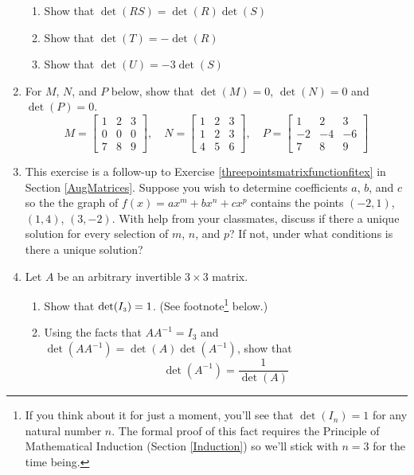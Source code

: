 \documentclass{ximera}
\begin{document}
\begin{enumerate}
\begin{enumerate}

\item Show that $\det(RS) = \det(R)\det(S)$
\item Show that $\det(T) = -\det(R)$
\item Show that $\det(U) = -3\det(S)$

\end{enumerate}

\item For $M$,  $N$, and $P$ below, show that $\det(M) = 0$, $\det(N) = 0$ and $\det(P) = 0$. \[M = \left[ \begin{array}{rrr} 1 & 2 & 3 \\ 0 & 0 & 0 \\ 7 & 8 & 9 \end{array} \right], \quad N = \left[ \begin{array}{rrr} 1 & 2 & 3 \\ 1 & 2 & 3 \\ 4 & 5 & 6 \end{array} \right] , \quad  P =  \left[ \begin{array}{rrr} 1 & 2 & 3 \\ -2 & -4 & -6 \\ 7 & 8 & 9 \end{array} \right]  \]

\item  This exercise is a follow-up to Exercise \ref{threepointsmatrixfunctionfitex} in Section \ref{AugMatrices}.   Suppose you wish to determine coefficients $a$, $b$, and $c$ so the the graph of $f(x) = ax^{m} + bx^{n} + cx^{p}$ contains the points  $(-2,1)$, $(1,4)$, $(3,-2)$.  With help from your classmates, discuss if there a unique solution for every selection of $m$, $n$, and $p$?  If not, under what conditions is there a unique solution?

\item Let $A$ be an arbitrary invertible $3 \times 3$ matrix.  

\begin{enumerate}

\item Show that $\det(I_{\mbox{\tiny$3$}}) = 1$. (See footnote\footnote{If you think about it for just a moment, you'll see that $\det(I_{n}) = 1$ for any natural number $n$.  The formal proof of this fact requires the Principle of Mathematical Induction (Section \ref{Induction}) so we'll stick with $n = 3$ for the time being.} below.)

\item Using the facts that $AA^{-1} = I_{3}$ and $\det(AA^{-1}) = \det(A)\det(A^{-1})$, show that \[\det(A^{-1}) = \dfrac{1}{\det(A)}\]

\end{enumerate}

\setcounter{HW}{\value{enumi}}
\end{enumerate}
\end{document}
